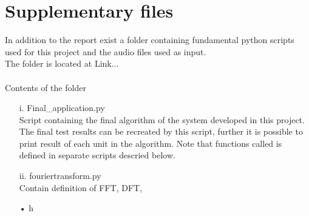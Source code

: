 \clearpage
\chapter{Supplementary files} \label{app:sup}
In addition to the report exist a folder containing fundamental python scripts used for this project and the audio files used as input. 
\\
The folder is located at\: Link... \\
\\
Contents of the folder\:\\
\begin{itemize}
\item[i.]Final_application.py \\
Script containing the final algorithm of the system developed in this project. The final test results can be recreated by this script, further it is possible to print result of each unit in the algorithm. Note that functions called is defined in separate scripts descried below.   

\item[ii.]fouriertransform.py \\
Contain definition of FFT, DFT, 
\item[•] h
\end{itemize}
